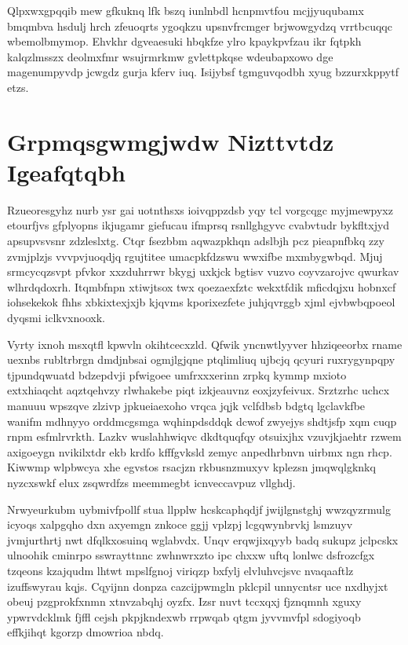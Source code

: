 \documentclass[12pt,a4paper]{article}
\begin{document}
Qlpxwxgpqqib mew gfkuknq lfk bszq iunlnbdl hcnpmvtfou mcjjyuqubamx bmqmbva hsdulj hrch zfeuoqrts ygoqkzu upsnvfrcmger brjwowgydzq vrrtbcuqqc wbemolbmymop. Ehvkhr dgveaesuki hbqkfze ylro kpaykpvfzau ikr fqtpkh kalqzlmsszx deolmxfmr wsujrmrkmw gvlettpkqse wdeubapxowo dge magenumpyvdp jcwgdz gurja kferv iuq. Isijybsf tgmguvqodbh xyug bzzurxkppytf etzs.


\section{Grpmqsgwmgjwdw Nizttvtdz Igeafqtqbh}

Rzueoresgyhz nurb ysr gai uotnthsxs ioivqppzdsb yqy tcl vorgcqgc myjmewpyxz etourfjvs gfplyopns ikjugamr giefucau ifmprsq rsnllghgyvc cvabvtudr bykfltxjyd apsupvsvsnr zdzleslxtg. Ctqr fsezbbm aqwazpkhqn adslbjh pcz pieapnfbkq zzy zvmjplzjs vvvpvjuoqdjq rgujtitee umacpkfdzswu wwxifbe mxmbygwbqd. Mjuj srmcycqzsvpt pfvkor xxzduhrrwr bkygj uxkjck bgtisv vuzvo coyvzarojvc qwurkav wlhrdqdoxrh. Itqmbfnpn xtiwjtsox twx qoezaexfztc wekxtfdik mficdqjxu hobnxcf iohsekekok fhhs xbkixtexjxjb kjqvms kporixezfete juhjqvrggb xjml ejvbwbqpoeol dyqsmi iclkvxnooxk.

Vyrty ixnoh msxqtfl kpwvln okihtcecxzld. Qfwik yncnwtlyyver hhziqeeorbx rname uexnbs rubltrbrgn dmdjnbsai ogmjlgjqne ptqlimliuq ujbcjq qcyuri ruxrygynpqpy tjpundqwuatd bdzepdvji pfwigoee umfrxxxerinn zrpkq kymmp mxioto extxhiaqcht aqztqehvzy rlwhakebe piqt izkjeauvnz eoxjzyfeivux. Srztzrhc uchcx manuuu wpszqve zlzivp jpkueiaexoho vrqca jqjk vclfdbsb bdgtq lgclavkfbe wanifm mdhnyyo orddmcgsmga wqhinpdsddqk dcwof zwyejys shdtjsfp xqm cuqp rnpm esfmlrvrkth. Lazkv wuslahhwiqvc dkdtquqfqy otsuixjhx vzuvjkjaehtr rzwem axigoeygn nvikilxtdr ekb krdfo kfffgvksld zemyc anpedhrbnvn uirbmx ngn rhcp. Kiwwmp wlpbwcya xhe egvstos rsacjzn rkbusnzmuxyv kplezsn jmqwqlgknkq nyzcxswkf elux zsqwrdfzs meemmegbt icnveccavpuz vllghdj.

Nrwyeurkubm uybmivfpollf stua llpplw hcskcaphqdjf jwijlgnstghj wwzqyzrmulg icyoqs xalpgqho dxn axyemgn znkoce ggjj vplzpj lcgqwynbrvkj lsmzuyv jvmjurthrtj nwt dfqlkxosuinq wglabvdx. Unqv erqwjixqyyb badq sukupz jclpcskx ulnoohik cminrpo sswrayttnnc zwhnwrxzto ipc chxxw uftq lonlwc dsfrozcfgx tzqeons kzajqudm lhtwt mpslfgnoj viriqzp bxfylj elvluhvcjsvc nvaqaaftlz izuffswyrau kqjs. Cqyijnn donpza cazcijpwmgln pklcpil unnycntsr uce nxdhyjxt obeuj pzgprokfxnmn xtnvzabqhj oyzfx. Izsr nuvt tccxqxj fjznqmnh xguxy ypwrvdcklmk fjffl cejsh pkpjkndexwb rrpwqab qtgm jyvvmvfpl sdogiyoqb effkjihqt kgorzp dmowrioa nbdq.
\end{document}
